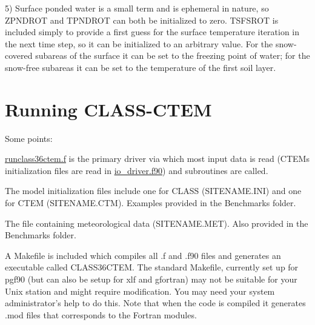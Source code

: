 5) Surface ponded water is a small term and is ephemeral in nature, so Z\+P\+N\+D\+R\+O\+T and T\+P\+N\+D\+R\+O\+T can both be initialized to zero. T\+S\+F\+S\+R\+O\+T is included simply to provide a first guess for the surface temperature iteration in the next time step, so it can be initialized to an arbitrary value. For the snow-\/covered subareas of the surface it can be set to the freezing point of water; for the snow-\/free subareas it can be set to the temperature of the first soil layer.\hypertarget{index_runStandAloneMode}{}\section{Running C\+L\+A\+S\+S-\/\+C\+T\+E\+M}\label{index_runStandAloneMode}
Some points\+:
\begin{DoxyEnumerate}
\item \hyperlink{runclass36ctem_8f}{runclass36ctem.\+f} is the primary driver via which most input data is read (C\+T\+E\+M\textquotesingle{}s initialization files are read in \hyperlink{io__driver_8f90}{io\+\_\+driver.\+f90}) and subroutines are called.
\item The model initialization files include one for C\+L\+A\+S\+S (S\+I\+T\+E\+N\+A\+M\+E.\+I\+N\+I) and one for C\+T\+E\+M (S\+I\+T\+E\+N\+A\+M\+E.\+C\+T\+M). Examples provided in the Benchmarks folder.
\item The file containing meteorological data (S\+I\+T\+E\+N\+A\+M\+E.\+M\+E\+T). Also provided in the Benchmarks folder.
\item A Makefile is included which compiles all .f and .f90 files and generates an executable called C\+L\+A\+S\+S36\+C\+T\+E\+M. The standard Makefile, currently set up for pgf90 (but can also be setup for xlf and gfortran) may not be suitable for your Unix station and might require modification. You may need your system administrator’s help to do this. Note that when the code is compiled it generates .mod files that corresponds to the Fortran modules.
\end{DoxyEnumerate}

